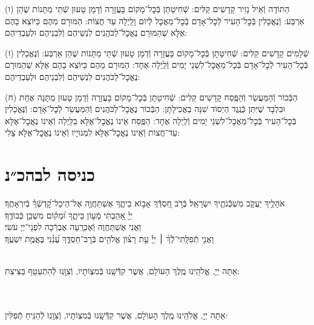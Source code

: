\documentclass[twoside, openany, parskip=half, 11pt]{book}
\begin{document}
(ו) הַתּוֹדָה וְֿאֵיל נָזִיר קָדָשִׁים קַלִּים: שְֿׁחִיטָתָן בְּֿכׇל־מָקוֹם בָּעֲזָרָה וְֿדָמָן טָעוּן שְֿׁתֵּי מַתָּנוֹת שֶׁהֵן אַרְבַּע: וְֿנֶאֱכָלִין בְּֿכׇל־הָעִיר לְֿכׇל־אָדָם בְּֿכׇל־מַאֲכׇל לְֿיוֹם וָלַֽיְלָה עַד חֲצוֹת: הַמּוּרָם מֵהֶם כַּיּוֹצֵא בָהֶם אֶלָּא שֶׁהַמּוּרָם נֶאֱכׇל־לַכֹּהֲנִים לִנְשֵׁיהֶם וְֿלִבְנֵיהֶם וּלְעַבְדֵיהֶם:

(ז) שְֿׁלָמִים קָדָשִׁים קַלִּים: שְֿׁחִיטָתָן בְּֿכׇל־מָקוֹם בָּעֲזָרָה וְֿדָמָן טָעוּן שְֿׁתֵּי מַתָּנוֹת שֶׁהֵן אַרְבַּע: וְֿנֶאֱכָלִין בְּֿכׇל־הָעִיר לְֿכׇל־אָדָם בְּֿכׇל־מַאֲכׇל־לִשְׁנֵי יָמִים וְֿלַֽיְלָה אֶחָד: הַמּוּרָם מֵהֶם כַּיּוֹצֵא בָהֶם אֶלָּא שֶׁהַמּוּרָם נֶאֱכׇל־לַכֹּהֲנִים לִנְשֵׁיהֶם וְֿלִבְנֵיהֶם וּלְעַבְדֵיהֶם:

(ח) הַבְּֿכוֹר וְֿהַמַּעֲשֵׂר וְֿהַפֶּֽסַח קָדָשִׁים קַלִּים: שְֿׁחִיטָתָן בְּֿכׇל־מָקוֹם בָּעֲזָרָה וְֿדָמָן טָעוּן מַתָּנָה אֶחָת וּבִלְבָד שֶׁיִּתֵּן כְּֿנֶֽגֶד הַיְסוֹד שִׁנָּה בַאֲכִילָתָן: הַבְּֿכוֹר נֶאֱכׇל־לַכֹּהֲנִים וְֿהַמַּעֲשֵׂר לְֿכׇל־אָדָם: וְֿנֶּאֱכָלִין בְּֿכׇל־הָעִיר בְּֿכׇל־מַאֲכׇל־לִשְׁנֵי יָמִים וְֿלַֽיְלָה אֶחָד: הַפֶּֽסַח אֵינוֹ נֶאֱכׇל־אֶלָּא בַלַּֽיְלָה וְֿאֵינוֹ נֶאֱכׇל־אֶלָּא עַד־חֲצוֹת וְֿאֵינוֹ נֶאֱכׇל־אֶלָּא לִמְנוּיָיו וְֿאֵינוֹ נֶאֱכׇל־אֶלָּא צָלִי:\\


\section[כניסה לבהכ״נ]{ כניסה לבהכ״נ }
אֹהָלֶ֖יךָ יַעֲקֹ֑ב מִשְׁכְּֿֿנֹתֶ֖יךָ יִשְׂרָאֵֽל׃
בְּֿרֹ֣ב חַ֭סְדְּֿֿךָ אָב֣וֹא בֵיתֶ֑ךָ אֶשְׁתַּחֲוֶ֥ה אֶל־הֵיכַל־קׇ֝דְשְֿׁךָ֗ בְּֿיִרְאָתֶֽךָ׃\\
יְיָ֗ אָ֭הַבְתִּי מְֿע֣וֹן בֵּיתֶ֑ךָ וּ֝מְק֗וֹם מִשְׁכַּ֥ן כְּֿבוֹדֶֽךָ׃ \\
וַאֲנִי אֶשְׁתַּחֲוֶה וְֿאֶכְרָֽעָה אֶבְרְֿכָה לִפְנֵי־יְיָ עֹשִׂי׃\\
וַאֲנִ֤י
%
תְֿפִלָּֽתִי־לְֿֿךָ֨ ׀ יְיָ֡ עֵ֤ת רָצ֗וֹן אֱלֹהִ֥ים בְּֿרׇב־חַסְדֶּ֑ךָ עֲ֝נֵ֗נִי בֶּאֱמֶ֥ת יִשְׁעֶֽךָ׃

\\
אַתָּה יְיָ, אֱלֹהֵֽינוּ מֶֽלֶךְ הָעוֹלָם, אֲשֶׁר קִדְּֿֿשָֽׁנוּ בְּֿמִצְוֹתָיו, וְֿצִוָּֽנוּ לְֿהִתְעַטֵּף בַּצִּיצִת:


\\
\\
אַתָּה יְיָ, אֱלֹהֵֽינוּ מֶֽלֶךְ הָעוֺלָם, אֲשֶׁר קִדְּֿֿשָֽׁנוּ בְּֿמִצְוֹתָיו, וְֿצִוָֽנוּ לְֿהַנִּֽיחַ תְּֿפִלִּין:
\end{document}
